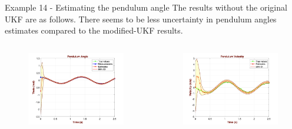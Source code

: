 \begin{frame}{Example 14 - Estimating the pendulum angle}
The results without the original UKF are as follows. There seems to be less uncertainty in pendulum angles estimates compared to the modified-UKF results. 
\begin{columns}
        \begin{figure}
            \centering
            \includegraphics[width=0.9\linewidth]{Figures//Part3/Ex14_PendulumAngle_UKF.png}
        \end{figure}
        \begin{figure}
            \centering
            \includegraphics[width=0.9\linewidth]{Figures//Part3/Ex14_PendulumVelocity_UKF.png}
        \end{figure}
\end{columns}    
\end{frame}

